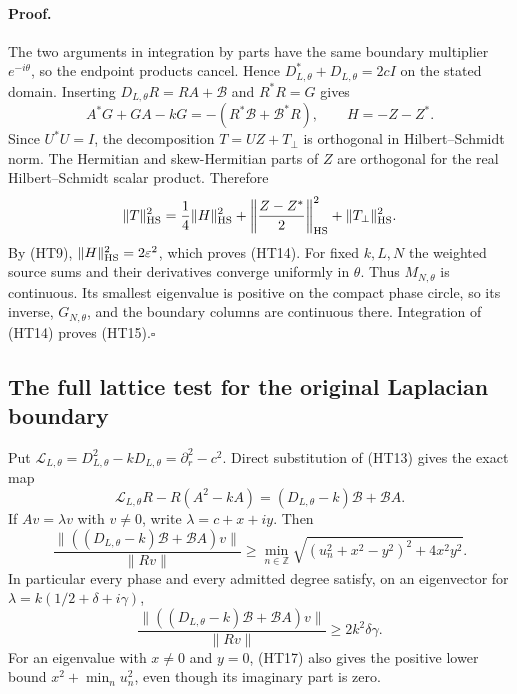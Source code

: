 \paragraph{Proof.}
The two arguments in integration by parts have the same boundary
multiplier $e^{-i\theta}$, so the endpoint products cancel.  Hence
$D_{L,\theta}^*+D_{L,\theta}=2cI$ on the stated domain.  Inserting
$D_{L,\theta}R=RA+\mathscr B$ and $R^*R=G$ gives
\[
 A^*G+GA-kG=-(R^*\mathscr B+\mathscr B^*R),\qquad H=-Z-Z^*.
\]
Since $U^*U=I$, the decomposition $T=UZ+T_\perp$ is orthogonal in
Hilbert--Schmidt norm.  The Hermitian and skew-Hermitian parts of $Z$
are orthogonal for the real Hilbert--Schmidt scalar product.  Therefore
\[
 \|T\|_{\rm HS}^2
 =\frac14\|H\|_{\rm HS}^2
 +\left\|\frac{Z-Z^*}{2}\right\|_{\rm HS}^2
 +\|T_\perp\|_{\rm HS}^2.
\]
By (HT9), $\|H\|_{\rm HS}^2=2\varepsilon^2$, which proves (HT14).
For fixed $k,L,N$ the weighted source sums and their derivatives converge
uniformly in $\theta$.  Thus $M_{N,\theta}$ is continuous.  Its smallest
eigenvalue is positive on the compact phase circle, so its inverse,
$G_{N,\theta}$, and the boundary columns are continuous there.
Integration of (HT14) proves (HT15).\hfill$\square$

\subsection{The full lattice test for the original Laplacian boundary}

Put $\mathscr L_{L,\theta}=D_{L,\theta}^2-kD_{L,\theta}
=\partial_r^2-c^2$.  Direct substitution of (HT13) gives the exact map
\[
 \mathscr L_{L,\theta}R-R(A^2-kA)
 =(D_{L,\theta}-k)\mathscr B+\mathscr BA.
 \tag{HT16}
\]
If $Av=\lambda v$ with $v\ne0$, write $\lambda=c+x+iy$.  Then
\[
 \frac{\|((D_{L,\theta}-k)\mathscr B+\mathscr BA)v\|}
 {\|Rv\|}
 \geq
 \min_{n\in\mathbb Z}
 \sqrt{(u_n^2+x^2-y^2)^2+4x^2y^2}.
 \tag{HT17}
\]
In particular every phase and every admitted degree satisfy, on an
eigenvector for $\lambda=k(1/2+\delta+i\gamma)$,
\[
 \boxed{
 \frac{\|((D_{L,\theta}-k)\mathscr B+\mathscr BA)v\|}
 {\|Rv\|}\geq 2k^2\delta\gamma.}
 \tag{HT18}
\]
For an eigenvalue with $x\ne0$ and $y=0$, (HT17) also gives the positive
lower bound $x^2+\min_nu_n^2$, even though its imaginary part is zero.

